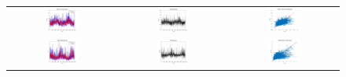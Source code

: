 \begin{figure}[ht!]
  \centering
  \begin{tabular}{ccc}
    \includegraphics[width=0.32\textwidth]{graphs/hybrid/48 hours/mean_fr/actual vs forecast.jpg} &
    \includegraphics[width=0.32\textwidth]{graphs/hybrid/48 hours/mean_fr/residuals.jpg} &
    \includegraphics[width=0.32\textwidth]{graphs/hybrid/48 hours/mean_fr/scatter plot.jpg} \\
    \includegraphics[width=0.32\textwidth]{graphs/hybrid/48 hours/s_wht/actual vs forecast.jpg} &
    \includegraphics[width=0.32\textwidth]{graphs/hybrid/48 hours/s_wht/residuals.jpg} &
    \includegraphics[width=0.32\textwidth]{graphs/hybrid/48 hours/s_wht/scatter plot.jpg} \\

\end{tabular}
\end{figure}
